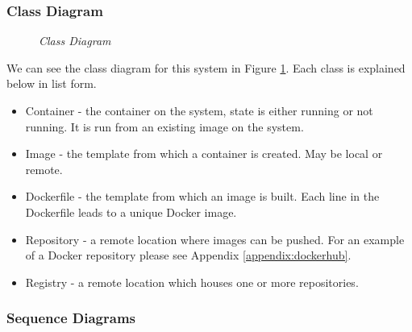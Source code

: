 \subsubsection{Class Diagram}
\begin{figure}[!ht]
\centering
{}
\caption{\em Class Diagram}
\label{fig:class-diagram}
\end{figure}

We can see the class diagram for this system in Figure \ref{fig:class-diagram}. Each class is explained below in list form.

\begin{itemize}
	\item Container - the container on the system, state is either running or not running. It is run from an existing image on the system.
	\item Image - the template from which a container is created. May be local or remote.
	\item Dockerfile - the template from which an image is built. Each line in the Dockerfile leads to a unique Docker image.
	\item Repository - a remote location where images can be pushed. For an example of a Docker repository please see Appendix \ref{appendix:dockerhub}.
	\item Registry - a remote location which houses one or more repositories.
\end{itemize}

\subsubsection{Sequence Diagrams}


